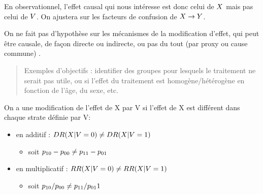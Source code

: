 \documentclass[
]{book}
\providecommand{\tightlist}{%
  \setlength{\itemsep}{0pt}\setlength{\parskip}{0pt}}
\begin{document}
En observationnel, l'effet causal qui nous intéresse est donc celui de \(\small X\) mais pas celui de \(\small V\).
On ajustera sur les facteurs de confusion de \(\small X \rightarrow Y\).

On ne fait pas d'hypothèse sur les mécanismes de la modification d'effet, qui peut être causale, de façon directe ou indirecte, ou pas du tout (par proxy ou cause commune) \citet{vanderweele_four_2007}.

\begin{quote}
Exemples d'objectifs : identifier des groupes pour lesquels le traitement ne serait pas utile, ou si l'effet du traitement est homogène/hétérogène en fonction de l'âge, du sexe, etc.
\end{quote}

On a une modification de l'effet de X par V si l'effet de X est différent dans chaque strate définie par V:

\begin{itemize}
\tightlist
\item
  en additif : \(\small DR(X | V=0) \neq DR(X | V=1)\)

  \begin{itemize}
  \tightlist
  \item
    soit \(\small p_{10}-p_{00} \neq p_{11}-p_{01}\)\\
  \end{itemize}
\item
  en multiplicatif : \(\small RR(X | V=0) \neq RR(X | V=1)\)

  \begin{itemize}
  \tightlist
  \item
    soit \(\small p_{10}/p_{00} \neq p_{11}/p_{01}1\)
  \end{itemize}
\end{itemize}
\end{document}
